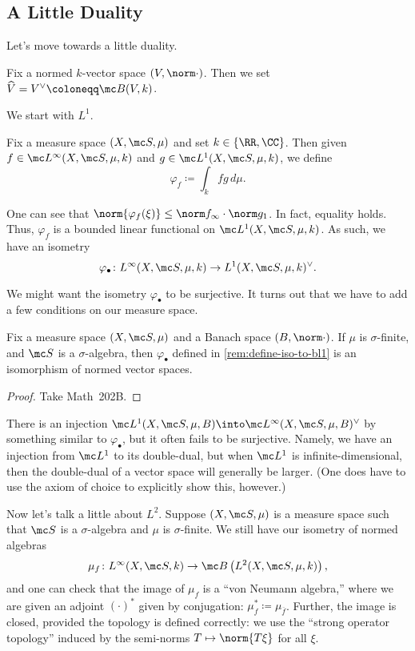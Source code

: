 \documentclass[../notes.tex]{subfiles}
\begin{document}
\subsection{A Little Duality}
Let's move towards a little duality.
\begin{notation}
	Fix a normed $k$-vector space $(V,\norm\cdot)$. Then we set $\widehat V=V^\lor\coloneqq\mc B(V,k)$.
\end{notation}
We start with $L^1$.
\begin{notation}
	Fix a measure space $(X,\mc S,\mu)$ and set $k\in\{\RR,\CC\}$. Then given $f\in\mc L^\infty(X,\mc S,\mu,k)$ and $g\in\mc L^1(X,\mc S,\mu,k)$, we define
	\[\varphi_f\coloneqq\int_kfg\,d\mu.\]
\end{notation}
\begin{remark} \label{rem:define-iso-to-bl1}
	One can see that $\norm{\varphi_f(\xi)}\le\norm f_\infty\cdot\norm g_1$. In fact, equality holds. Thus, $\varphi_f$ is a bounded linear functional on $\mc L^1(X,\mc S,\mu,k)$. As such, we have an isometry
	\[\varphi_\bullet\colon L^\infty(X,\mc S,\mu,k)\to L^1(X,\mc S,\mu,k)^\lor.\]
\end{remark}
We might want the isometry $\varphi_\bullet$ to be surjective. It turns out that we have to add a few conditions on our measure space.
\begin{theorem}
	Fix a measure space $(X,\mc S,\mu)$ and a Banach space $(B,\norm\cdot)$. If $\mu$ is $\sigma$-finite, and $\mc S$ is a $\sigma$-algebra, then $\varphi_\bullet$ defined in \autoref{rem:define-iso-to-bl1} is an isomorphism of normed vector spaces.
\end{theorem}
\begin{proof}
	Take Math~202B.
\end{proof}
\begin{remark}
	There is an injection $\mc L^1(X,\mc S,\mu,B)\into\mc L^\infty(X,\mc S,\mu,B)^\lor$ by something similar to $\varphi_\bullet$, but it often fails to be surjective. Namely, we have an injection from $\mc L^1$ to its double-dual, but when $\mc L^1$ is infinite-dimensional, then the double-dual of a vector space will generally be larger. (One does have to use the axiom of choice to explicitly show this, however.)
\end{remark}
Now let's talk a little about $L^2$. Suppose $(X,\mc S,\mu)$ is a measure space such that $\mc S$ is a $\sigma$-algebra and $\mu$ is $\sigma$-finite. We still have our isometry of normed algebras
\[\mu_f\colon L^\infty(X,\mc S,k)\to\mc B\left(L^2(X,\mc S,\mu,k)\right),\]
and one can check that the image of $\mu_f$ is a ``von Neumann algebra,'' where we are given an adjoint $(\cdot)^*$ given by conjugation: $\mu_f^*\coloneqq\mu_{\overline f}$. Further, the image is closed, provided the topology is defined correctly: we use the ``strong operator topology'' induced by the semi-norms $T\mapsto\norm{T\xi}$ for all $\xi$.
\end{document}
